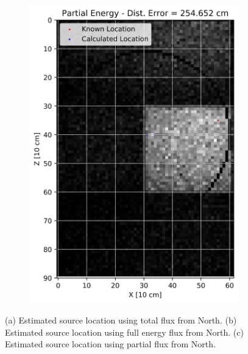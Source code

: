 \begin{figure}[!htb]
\begin{subfigure}[b]{0.15\textwidth}
   \includegraphics[width=1\linewidth]{images/2Cent_Part_2fl_Wall_N}
   \caption{}
   \label{fig:RanP2WN}
\end{subfigure}
\caption{(a) Estimated source location using total flux from North. (b) Estimated source location using full energy flux from North. (c) Estimated source location using partial flux from North.}
\end{figure}

